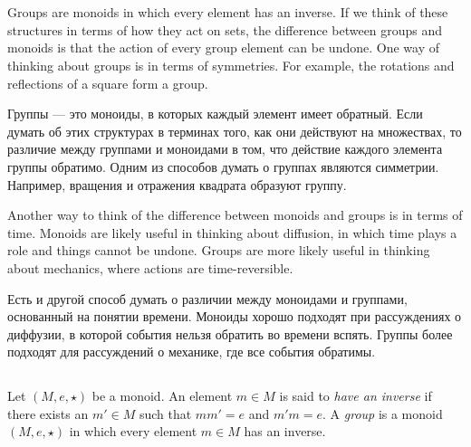 \documentclass[../main/CT4S-EN-RU]{subfiles}
\begin{document}
\section{}\label{sec:groups}

\begin{blockENG}
Groups are monoids in which every element has an inverse. If we think of these structures in terms of how they act on sets, the difference between groups and monoids is that the action of every group element can be undone. One way of thinking about groups is in terms of symmetries. For example, the rotations and reflections of a square form a group. 
\end{blockENG}

\begin{blockRUS}
Группы — это моноиды, в которых каждый элемент имеет обратный. Если думать об этих структурах в терминах того, как они действуют на множествах, то различие между группами и моноидами в том, что действие каждого элемента группы обратимо. Одним из способов думать о группах являются симметрии. Например, вращения и отражения квадрата образуют группу. 
\end{blockRUS}

\begin{blockENG}
Another way to think of the difference between monoids and groups is in terms of time. Monoids are likely useful in thinking about diffusion, in which time plays a role and things cannot be undone. Groups are more likely useful in thinking about mechanics, where actions are time-reversible. 
\end{blockENG}

\begin{blockRUS}
Есть и другой способ думать о различии между моноидами и группами, основанный на понятии времени. Моноиды хорошо подходят при рассуждениях о диффузии, в которой события нельзя обратить во времени вспять. Группы более подходят для рассуждений о механике, где все события обратимы.
\end{blockRUS}


\subsection{}

\begin{definitionENG}\label{def:group}
Let $(M,e,\star)$ be a monoid. An element $m\in M$ is said to {\em have an inverse} if there exists an $m'\in M$ such that $mm'=e$ and $m'm=e.$ A {\em group} is a monoid $(M,e,\star)$ in which every element $m\in M$ has an inverse.
\end{definitionENG}
\end{document}
